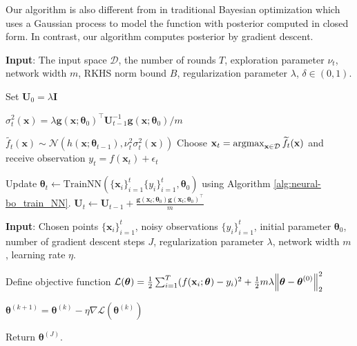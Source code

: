Our algorithm is also different from \citet{chowdhury2017kernelized} in traditional Bayesian optimization which uses a Gaussian process to model the function with posterior computed in closed form. In contrast, our algorithm computes posterior by gradient descent. 

\begin{algorithm}[]
\caption{Neural Black-box Optimization (Neural-BO)}
\label{alg:Neural-BO}
\textbf{Input}: The input space $\mathcal D$, the number of rounds $T$, exploration parameter $\nu_t$, network width $m$, RKHS norm bound $B$, regularization parameter $\lambda$, $\delta \in (0,1)$.
\begin{algorithmic}[1]
\State Set $\mathbf{U}_0 = \lambda \mathbf{I}$ 

\State $\sigma^2_t (\mathbf{x}) = \lambda \mathbf{g}(\mathbf{x};\boldsymbol{\theta}_0)^\top\mathbf{U}_{t-1}^{-1}\mathbf{g}(\mathbf{x};\boldsymbol{\theta}_0)/m$ \label{line:neural-bo_calculate_var}

\State $\widetilde{f_t}(\mathbf{x}) \sim \mathcal{N}(h(\mathbf{x}; \boldsymbol{\theta}_{t-1}), \nu_t^2 \sigma^2_t(\mathbf{x}))$ 
\State Choose $\mathbf{x}_t = \operatorname*{argmax}_{\mathbf{x} \in \mathcal{D}} \widetilde{f_t}(\mathbf{x}) $ and receive observation $y_t = f(\mathbf{x}_t) + \epsilon_t$ 
   
\State Update $\boldsymbol{\theta}_t \leftarrow \text{TrainNN}(\{\mathbf{x}_i\}^t_{i=1} \{y_i\}^t_{i=1}, \boldsymbol{\theta}_0)$ using Algorithm \ref{alg:neural-bo_train_NN}. \label{line:neural-bo_train_NN}
\State $\mathbf{U}_t \leftarrow \mathbf{U}_{t-1} +  \frac{\mathbf{g}(\mathbf{x}_t;\boldsymbol{\theta}_0)\mathbf{g}(\mathbf{x}_t; \boldsymbol{\theta}_0)^\top}{m} $ \label{line:neural-bo_update_Ut}
\EndFor
\end{algorithmic}
\end{algorithm}

\begin{algorithm}[H]
\caption{TrainNN}
\label{alg:neural-bo_train_NN}
\textbf{Input}: Chosen points $\{\mathbf{x}_i\}^t_{i=1}$, noisy observations $\{y_i\}^t_{i=1}$, initial parameter $\boldsymbol{\theta}_0$, number of gradient descent steps $J$, regularization parameter $\lambda$, network width $m$, learning rate $\eta$.
\begin{algorithmic}[1]
\State Define objective function $\mathcal{L}(\boldsymbol{\theta})  = \frac{1}{2}\sum^T_{i=1} (f(\mathbf{x}_i; \boldsymbol{\theta}) - y_i)^2 + \frac{1}{2}m\lambda\norm{\boldsymbol{\theta} - \boldsymbol{\theta}^{(0)}}^2_2$

$\boldsymbol{\theta}^{(k+1)} = \boldsymbol{\theta}^{(k)} - \eta \nabla \mathcal{L}(\boldsymbol{\theta}^{(k)})$
\EndFor

\State Return $\boldsymbol{\theta}^{(J)}$.
\end{algorithmic}
\end{algorithm}


